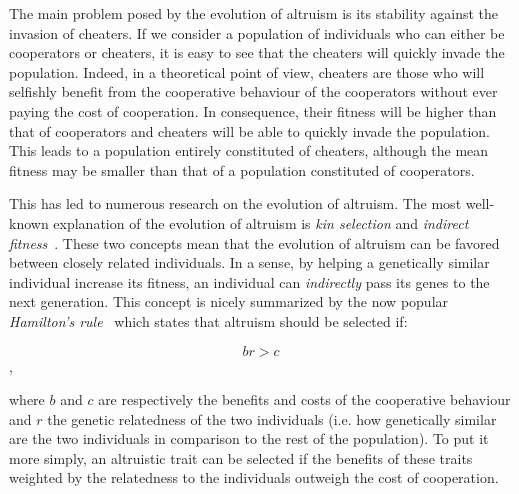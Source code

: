     The main problem posed by the evolution of altruism is its stability against the invasion of cheaters. If we consider a population of individuals who can either be cooperators or cheaters, it is easy to see that the cheaters will quickly invade the population. Indeed, in a theoretical point of view, cheaters are those who will selfishly benefit from the cooperative behaviour of the cooperators without ever paying the cost of cooperation. In consequence, their fitness will be higher than that of cooperators and cheaters will be able to quickly invade the population. This leads to a population entirely constituted of cheaters, although the mean fitness may be smaller than that of a population constituted of cooperators.

    This has led to numerous research on the evolution of altruism. The most well-known explanation of the evolution of altruism is \emph{kin selection} and \emph{indirect fitness}~\cite{Hamilton1964}. These two concepts mean that the evolution of altruism can be favored between closely related individuals. In a sense, by helping a genetically similar individual increase its fitness, an individual can \emph{indirectly} pass its genes to the next generation. This concept is nicely summarized by the now popular \emph{Hamilton's rule}~\cite{Hamilton1964} which states that altruism should be selected if:

    \[br > c\],

    where $b$ and $c$ are respectively the benefits and costs of the cooperative behaviour and $r$ the genetic relatedness of the two individuals (i.e. how genetically similar are the two individuals in comparison to the rest of the population). To put it more simply, an altruistic trait can be selected if the benefits of these traits weighted by the relatedness to the individuals outweigh the cost of cooperation.

